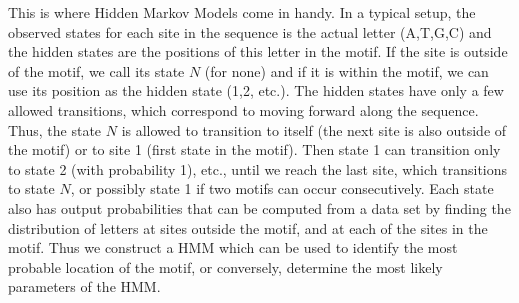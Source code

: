 \documentclass[11pt]{book}
\begin{document}
This is where Hidden Markov Models come in handy. In a typical setup, the observed states for each site in the sequence is the actual letter (A,T,G,C) and the hidden states are the positions of this letter in the motif. If the site is outside of the motif, we call its state $N$ (for none) and if it is within the motif, we can use its position as the hidden state (1,2, etc.). 
The hidden states have only a few allowed transitions, which correspond to moving forward along the sequence. Thus, the state $N$ is allowed to transition to itself (the next site is also outside of the motif) or to site 1 (first state in the motif). Then state 1 can transition only to state 2 (with probability 1), etc., until we reach the last site, which transitions to state $N$, or possibly state 1 if two motifs can occur consecutively. Each state also has output probabilities that can be computed from a data set by finding the distribution of letters at sites outside the motif, and at each of the sites in the motif.  Thus we construct a HMM which can be used to identify the most probable location of the motif, or conversely, determine the most likely parameters of the HMM.
\end{document}
